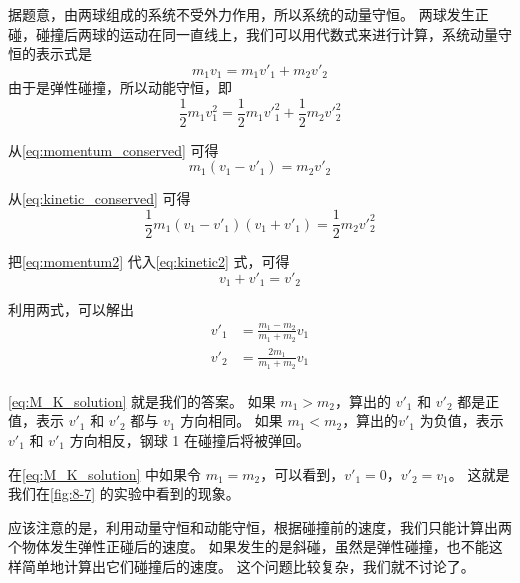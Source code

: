 \begin{solution}
  据题意，由两球组成的系统不受外力作用，所以系统的动量守恒。
  两球发生正碰，碰撞后两球的运动在同一直线上，我们可以用代数式来进行计算，系统动量守恒的表示式是
\begin{equation}
  \label{eq:momentum_conserved}
  m_1v_1=m_1v'_1+m_2v'_2
\end{equation}
由于是弹性碰撞，所以动能守恒，即
\begin{equation}
  \label{eq:kinetic_conserved}
  \frac{1}{2}m_1v_1^2=\frac{1}{2}m_1{v'}_1^2+\frac{1}{2}m_2{v'}_2^2
\end{equation}

从\cref{eq:momentum_conserved} 可得
\begin{equation}
  \label{eq:momentum2}
  m_1(v_1-v'_1)=m_2v'_2
\end{equation}

从\cref{eq:kinetic_conserved} 可得
\begin{equation}
  \label{eq:kinetic2}
  \frac{1}{2}m_1(v_1-v'_1)(v_1+v'_1)=\frac{1}{2}m_2{v'}_2^2
\end{equation}

把\cref{eq:momentum2} 代入\cref{eq:kinetic2} 式，可得
\begin{equation}
  \label{eq:kinetic_velocity}
 v_1+v'_1=v'_2   
\end{equation}

利用\label{eq:momentum2,eq:kinetic_velocity}两式，可以解出
\begin{equation}
  \label{eq:M_K_solution}
\begin{split}
    v'_1&=\frac{m_1-m_2}{m_1+m_2}v_1\\
    v'_2&=\frac{2m_1}{m_1+m_2}v_1\\
\end{split}
\end{equation}
\end{solution}

\cref{eq:M_K_solution} 就是我们的答案。
如果 $m_1>m_2$，算出的 $v'_1$ 和 $v'_2$ 都是正值，表示 $v'_1$ 和 $v'_2$ 都与 $v_1$ 方向相同。
如果 $m_1<m_2$，算出的$v'_1$ 为负值，表示 $v'_1$ 和 $v'_1$ 方向相反，钢球 1 在碰撞后将被弹回。

在\cref{eq:M_K_solution} 中如果令 $m_1=m_2$，可以看到，$v'_1=0$，$v'_2=v_1$。
这就是我们在\cref{fig:8-7} 的实验中看到的现象。

应该注意的是，利用动量守恒和动能守恒，根据碰撞前的速度，我们只能计算出两个物体发生弹性正碰后的速度。
如果发生的是斜碰，虽然是弹性碰撞，也不能这样简单地计算出它们碰撞后的速度。
这个问题比较复杂，我们就不讨论了。

